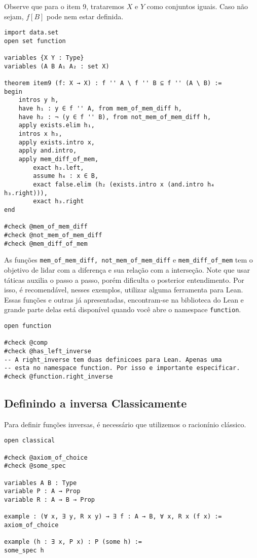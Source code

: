 \begin{theorem}[Item 9]
\end{theorem}

Observe que para o item 9, trataremos $X$ e $Y$ como conjuntos iguais. Caso
não sejam, $f[B]$ pode nem estar definida.

\begin{lstlisting}
import data.set
open set function

variables {X Y : Type}
variables (A B A₁ A₂ : set X)

theorem item9 (f: X → X) : f '' A \ f '' B ⊆ f '' (A \ B) :=
begin
    intros y h,
    have h₁ : y ∈ f '' A, from mem_of_mem_diff h,
    have h₂ : ¬ (y ∈ f '' B), from not_mem_of_mem_diff h,
    apply exists.elim h₁,
    intros x h₃,
    apply exists.intro x,
    apply and.intro,
    apply mem_diff_of_mem,
        exact h₃.left,
        assume h₄ : x ∈ B,
        exact false.elim (h₂ (exists.intro x (and.intro h₄ h₃.right))),
        exact h₃.right
end

#check @mem_of_mem_diff
#check @not_mem_of_mem_diff
#check @mem_diff_of_mem

\end{lstlisting}

As funções \lstinline{mem_of_mem_diff, not_mem_of_mem_diff} e
\lstinline{mem_diff_of_mem} tem o objetivo de lidar com a diferença e sua
relação com a interseção. Note que usar táticas auxilia o passo a passo, porém
dificulta o posterior entendimento. Por isso, é recomendável, nesses exemplos,
utilizar alguma ferramenta para Lean. Essas funções e outras já apresentadas,
encontram-se na biblioteca do Lean e grande parte delas está disponível quando
você abre o namespace \lstinline{function}.

\begin{lstlisting}
open function 

#check @comp 
#check @has_left_inverse
-- A right_inverse tem duas definicoes para Lean. Apenas uma
-- esta no namespace function. Por isso e importante especificar. 
#check @function.right_inverse    
\end{lstlisting}

\subsection{Definindo a inversa Classicamente}

Para definir funções inversas, é necessário que utilizemos o racionínio
clássico. 

\begin{lstlisting}
open classical 

#check @axiom_of_choice
#check @some_spec

variables A B : Type
variable P : A → Prop   
variable R : A → B → Prop

example : (∀ x, ∃ y, R x y) → ∃ f : A → B, ∀ x, R x (f x) :=
axiom_of_choice

example (h : ∃ x, P x) : P (some h) :=
some_spec h    
\end{lstlisting}

